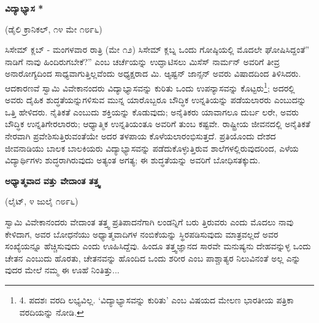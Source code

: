 \begin{center}
\textbf{ವಿದ್ಯಾಭ್ಯಾಸ *}
\end{center}

\begin{center}
(ಡೈಲಿ ಕ್ರಾನಿಕಲ್, ೧೪ ಮೇ ೧೮೯೬)
\end{center}

ಸಿಸೇಮ್​ ಕ್ಲಬ್ - ಮಂಗಳವಾರ ರಾತ್ರಿ (ಮೇ ೧೨) ಸಿಸೇಮ್​ ಕ್ಲಬ್ನ ಒಂದು ಗೋಷ್ಠಿಯಲ್ಲಿ ಮೊದಲೇ ಘೋಷಿಸಿದ್ದಂತೆ” ನಾಡಿಗೆ ನಾವು ಹಿಂದಿರುಗಬೇಕೆ?” ಎಂಬ ಚರ್ಚೆಯನ್ನು ಉದ್ಘಾಟಿಸಲು ಮಿಸೆಸ್ ನಾರ್ಮನ್ ಅವರಿಗೆ ತೀವ್ರ ಅನಾರೋಗ್ಯದಿಂದ ಸಾಧ್ಯವಾಗುತ್ತಿಲ್ಲವೆಂದು ಅಧ್ಯಕ್ಷರಾದ ಮಿ. ಆ್ಯಷ್ಟನ್ ಜಾನ್ಸನ್ ಅವರು ವಿಷಾದದಿಂದ ತಿಳಿಸಿದರು. ಆದಕಾರಣವೆ ಸ್ವಾಮಿ ವಿವೇಕಾನಂದರು ವಿದ್ಯಾಭ್ಯಾಸವನ್ನು ಕುರಿತು ಒಂದು ಉಪನ್ಯಾಸವನ್ನು ಕೊಟ್ಟರು\footnote{4. ಪದಶಃ ವರದಿ ಲಭ್ಯವಿಲ್ಲ. ‘ವಿದ್ಯಾಭ್ಯಾಸವನ್ನು ಕುರಿತು’ ಎಂಬ ವಿಷಯದ ಮೇಲಣ ಭಾರತೀಯ ಪತ್ರಿಕಾ ವರದಿಯನ್ನು ನೋಡಿ.}; ಅದರಲ್ಲಿ ಅವರು ದೈಹಿಕ ಶುದ್ಧತೆಯನ್ನುಗಳಿಸುವ ಮುನ್ನ ಯಾರೊಬ್ಬರೂ ಬೌದ್ಧಿಕ ಉನ್ನತಿಯನ್ನು ಪಡೆಯಲಾರರು ಎಂಬುದನ್ನು ಒತ್ತಿ ಹೇಳಿದರು. ನೈತಿಕತೆ ಎಂಬುದು ಶಕ್ತಿಯನ್ನು ಕೊಡುವುದು; ಅನೈತಿಕರು ಯಾವಾಗಲೂ ದುರ್ಬ ಲರೇ, ಅವರು ಬೌದ್ಧಿಕ ಉನ್ನತಿಗೇರಲಾರರು; ಆಧ್ಯಾತ್ಮಿಕ ಉನ್ನತಿಯಂತೂ ಅವರಿಗೆ ತುಂಬ ಕಷ್ಟವೇ. ರಾಷ್ಟ್ರೀಯ ಜೀವನದಲ್ಲಿ ಅನೈತಿಕತೆ ನೇರವಾಗಿ ಪ್ರವೇಶಿಸುತ್ತಿರುವಂತೆಯೇ ಅದರ ತಳಪಾಯ ಕೊಳೆಯಲಾರಂಭಿಸುತ್ತದೆ. ಪ್ರತಿಯೊಂದು ದೇಶದ ಜೀವನಾಡಿಯು ಬಾಲಕ ಬಾಲಕಿಯರು ವಿದ್ಯಾಭ್ಯಾಸವನ್ನು ಪಡೆದುಕೊಳ್ಳುತ್ತಿರುವ ಶಾಲೆಗಳಲ್ಲಿರುವುದರಿಂದ, ಎಳೆಯ ವಿದ್ಯಾರ್ಥಿಗಳು ಶುದ್ಧರಾಗಿರುವುದು ಅತ್ಯಂತ ಅಗತ್ಯ; ಈ ಶುದ್ಧತೆಯನ್ನು ಅವರಿಗೆ ಬೋಧಿಸತಕ್ಕುದು.

\begin{center}
\textbf{ಅಧ್ಯಾತ್ಮವಾದ ವತ್ತು ವೇದಾಂತ ತತ್ತ್ವ}
\end{center}

\begin{center}
(ಲೈಟ್, ೪ ಜುಲೈ ೧೮೯೬)
\end{center}

ಸ್ವಾಮಿ ವಿವೇಕಾನಂದರು ವೇದಾಂತ ತತ್ತ್ವ ಪ್ರತಿಪಾದನೆಗಾಗಿ ಲಂಡನ್ನಿಗೆ ಬರು ತ್ತಿರುವರು ಎಂದು ಮೊದಲು ನಾವು ಕೇಳಿದಾಗ, ಅವರ ಬೋಧನೆಯು ಅಧ್ಯಾತ್ಮವಾದಿಗಳ ನಂಬಿಕೆಯನ್ನು ಸ್ಥಿರಪಡಿಸುವುದು ಮಾತ್ರವಲ್ಲದೆ ಅವರ ಸಂಖ್ಯೆಯನ್ನೂ ಹೆಚ್ಚಿಸುವುದು ಎಂದು ಊಹಿಸಿದ್ದೆವು. ಹಿಂದೂ ತತ್ತ್ವಜ್ಞಾನದ ಸಾರವೇ ಮನುಷ್ಯನು ದೇಹವನ್ನುಳ್ಳ ಒಂದು ಚೇತನ ಎಂಬುದು ಹೊರತು, ಚೇತನವನ್ನು ಹೊಂದಿದ ಒಂದು ಶರೀರ ಎಂಬ ಪಾಶ್ಚಾತ್ಯರ ನಿಲುವಿನಂತೆ ಅಲ್ಲ ಎನ್ನು ವುದರ ಮೇಲೆ ನಮ್ಮ ಈ ಊಹೆ ನಿಂತಿತ್ತು...

